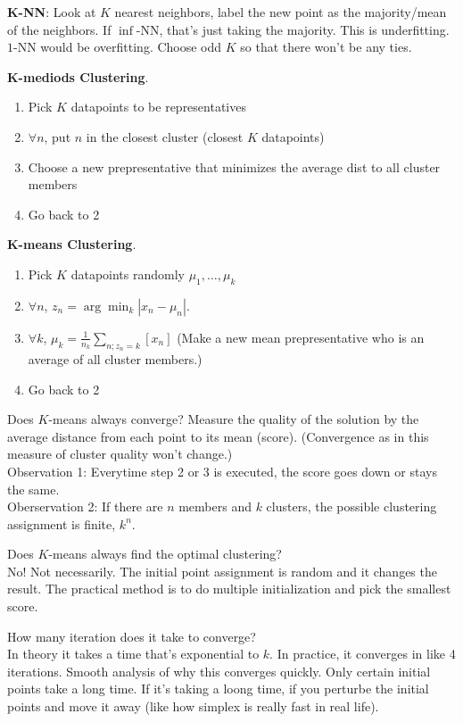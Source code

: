 \noi
\textbf{K-NN}: Look at $K$ nearest neighbors, label the new point as
the majority/mean of the neighbors. If $\inf$-NN, that's just taking the majority. This is
underfitting. $1$-NN would be overfitting. Choose odd $K$ so that
there won't be any ties.

\noi
\textbf{K-mediods Clustering}. 
\begin{enumerate}
\item Pick $K$ datapoints to be representatives
\item $\forall n$, put $n$ in the closest cluster (closest $K$ datapoints)
\item Choose a new prepresentative that minimizes the average dist to all
  cluster members
\item Go back to 2
\end{enumerate}
\noi
\textbf{K-means Clustering}. 
\begin{enumerate}
\item Pick $K$ datapoints randomly $\mu_1, \dots, \mu_k$
\item $\forall n$, $z_n = \arg\min_k |x_n - \mu_n|$. 
\item $\forall k$, $\mu_k = \frac{1}{n_k} \sum_{n; z_n = k}[x_n]$ (Make a new mean prepresentative who is an average of all cluster members.)
\item Go back to 2
\end{enumerate}
\noi
Does $K$-means always converge? 
Measure the quality of the solution by
the average distance from each point to its mean (score).
(Convergence as in this measure of cluster quality won't change.)\\
Observation 1:  Everytime step 2 or 3
is executed, the score goes down or stays the same. \\ 
Oberservation 2: If there are $n$ members and $k$ clusters, the
possible clustering assignment is finite, $k^n$.


\noi
Does $K$-means always find the optimal clustering?\\
No! Not necessarily. The initial point assignment is random and it
changes the result. The practical method is to do multiple
initialization and pick the smallest score.

\noi
How many iteration does it take to converge?\\
In theory it takes a time that's exponential to $k$. In practice, it
converges in like 4 iterations. Smooth analysis of why this converges
quickly. Only certain initial points take a long time. If it's taking a loong time, if you
perturbe the initial points and move it away (like how simplex is
really fast in real life).

